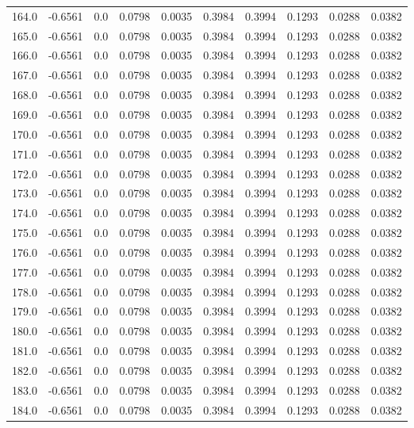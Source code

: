 \begin{longtable}{lrrrrrrrrr}
164.0 & -0.6561 & 0.0 & 0.0798 & 0.0035 & 0.3984 & 0.3994 & 0.1293 & 0.0288 & 0.0382 \\
165.0 & -0.6561 & 0.0 & 0.0798 & 0.0035 & 0.3984 & 0.3994 & 0.1293 & 0.0288 & 0.0382 \\
166.0 & -0.6561 & 0.0 & 0.0798 & 0.0035 & 0.3984 & 0.3994 & 0.1293 & 0.0288 & 0.0382 \\
167.0 & -0.6561 & 0.0 & 0.0798 & 0.0035 & 0.3984 & 0.3994 & 0.1293 & 0.0288 & 0.0382 \\
168.0 & -0.6561 & 0.0 & 0.0798 & 0.0035 & 0.3984 & 0.3994 & 0.1293 & 0.0288 & 0.0382 \\
169.0 & -0.6561 & 0.0 & 0.0798 & 0.0035 & 0.3984 & 0.3994 & 0.1293 & 0.0288 & 0.0382 \\
170.0 & -0.6561 & 0.0 & 0.0798 & 0.0035 & 0.3984 & 0.3994 & 0.1293 & 0.0288 & 0.0382 \\
171.0 & -0.6561 & 0.0 & 0.0798 & 0.0035 & 0.3984 & 0.3994 & 0.1293 & 0.0288 & 0.0382 \\
172.0 & -0.6561 & 0.0 & 0.0798 & 0.0035 & 0.3984 & 0.3994 & 0.1293 & 0.0288 & 0.0382 \\
173.0 & -0.6561 & 0.0 & 0.0798 & 0.0035 & 0.3984 & 0.3994 & 0.1293 & 0.0288 & 0.0382 \\
174.0 & -0.6561 & 0.0 & 0.0798 & 0.0035 & 0.3984 & 0.3994 & 0.1293 & 0.0288 & 0.0382 \\
175.0 & -0.6561 & 0.0 & 0.0798 & 0.0035 & 0.3984 & 0.3994 & 0.1293 & 0.0288 & 0.0382 \\
176.0 & -0.6561 & 0.0 & 0.0798 & 0.0035 & 0.3984 & 0.3994 & 0.1293 & 0.0288 & 0.0382 \\
177.0 & -0.6561 & 0.0 & 0.0798 & 0.0035 & 0.3984 & 0.3994 & 0.1293 & 0.0288 & 0.0382 \\
178.0 & -0.6561 & 0.0 & 0.0798 & 0.0035 & 0.3984 & 0.3994 & 0.1293 & 0.0288 & 0.0382 \\
179.0 & -0.6561 & 0.0 & 0.0798 & 0.0035 & 0.3984 & 0.3994 & 0.1293 & 0.0288 & 0.0382 \\
180.0 & -0.6561 & 0.0 & 0.0798 & 0.0035 & 0.3984 & 0.3994 & 0.1293 & 0.0288 & 0.0382 \\
181.0 & -0.6561 & 0.0 & 0.0798 & 0.0035 & 0.3984 & 0.3994 & 0.1293 & 0.0288 & 0.0382 \\
182.0 & -0.6561 & 0.0 & 0.0798 & 0.0035 & 0.3984 & 0.3994 & 0.1293 & 0.0288 & 0.0382 \\
183.0 & -0.6561 & 0.0 & 0.0798 & 0.0035 & 0.3984 & 0.3994 & 0.1293 & 0.0288 & 0.0382 \\
184.0 & -0.6561 & 0.0 & 0.0798 & 0.0035 & 0.3984 & 0.3994 & 0.1293 & 0.0288 & 0.0382 \\

\end{longtable}
